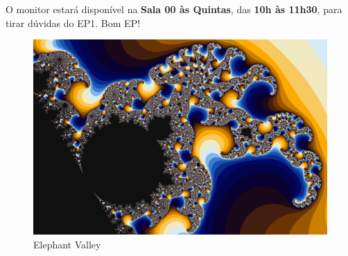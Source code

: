 \documentclass[final,12pt,a4paper]{elsarticle}
\begin{document}
O monitor estará disponível na \textbf{Sala 00 às Quintas}, das \textbf{10h às
11h30}, para tirar dúvidas do EP1.  Bom EP!

\begin{figure}[htpb]
    \centering
    \includegraphics[width=\textwidth]{elephant}
    \caption{Elephant Valley}
\end{figure}










\end{document}
